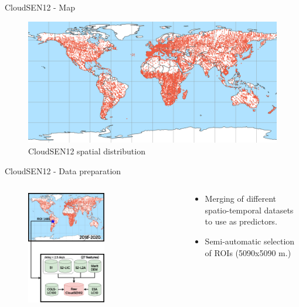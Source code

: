 \begin{frame}{CloudSEN12 - Map}
	\begin{center}
		\begin{figure}
			\includegraphics[width=0.85\linewidth]{images/intro_fig04.png}
			\caption[fig:introfig04]{CloudSEN12 spatial distribution}
		\end{figure}
	\end{center}
\end{frame}


\begin{frame}{CloudSEN12 - Data preparation}
	\begin{columns}
		\begin{column}{0.6\textwidth}
			\begin{figure}
				\includegraphics[width=0.6\textwidth]{images/methodology01.png}
				\label{fig:introfig02}
			\end{figure}
		\end{column}
		\begin{column}{0.4\textwidth}
			\begin{itemize}
				\item Merging of different spatio-temporal datasets to use as predictors.
				\item Semi-automatic selection of ROIs (5090x5090 m.)
			\end{itemize}
		\end{column}
	\end{columns}
\end{frame}




